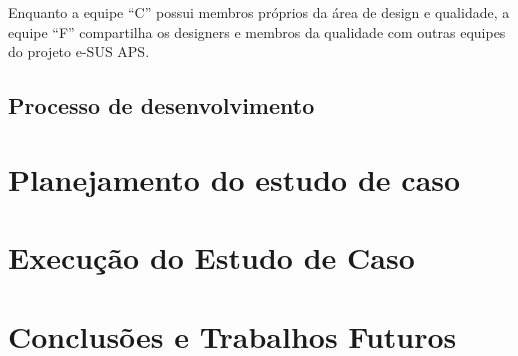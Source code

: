 \documentclass[
    12pt,       %
    openright,      %
    twoside,      %
    a4paper,      %
    english,      %
    french,       %
    spanish,      %
    brazil,       %
    ]{abntex2}
\begin{document}
Enquanto a equipe ``C'' possui membros próprios da área de design e qualidade, a equipe ``F'' compartilha os designers e membros da qualidade com outras equipes do projeto e-SUS APS. 

\section{Processo de desenvolvimento}

\chapter{Planejamento do estudo de caso}
\label{sec:Proposta}


\chapter{Execução do Estudo de Caso}
\label{sec:Experimentos}


\chapter{Conclusões e Trabalhos Futuros}
\label{sec:Conclusoes}


  \postextual


  
  

\end{document}

